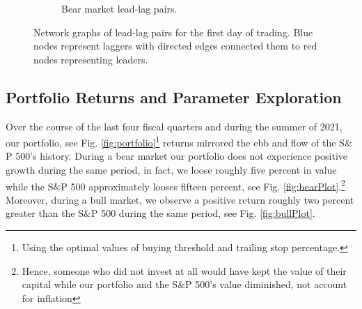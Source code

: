 \documentclass{article}
\begin{document}
\begin{figure}[H]
\begin{subfigure}{0.45\textwidth}
        \caption{Bear market lead-lag pairs.}
        \label{fig:bearNetwork}
    \end{subfigure}
    \caption{Network graphs of lead-lag pairs for the first day of trading. Blue nodes represent laggers with directed edges connected them to red nodes representing leaders.}
    \label{fig:networks}
\end{figure}
\subsection{Portfolio Returns and Parameter Exploration}
Over the course of the last four fiscal quarters and during the summer of 2021, our portfolio, see Fig. \ref{fig:portfolio}\footnote{Using the optimal values of buying threshold and trailing stop percentage.} returns mirrored the ebb and flow of the S$\&$P 500's history. During a bear market our portfolio does not experience positive growth during the same period, in fact, we loose roughly five percent in value while the S$\&$P 500 approximately looses fifteen percent, see Fig. \ref{fig:bearPlot}.\footnote{Hence, someone who did not invest at all would have kept the value of their capital while our portfolio and the S$\&$P 500's value diminished, not account for inflation} Moreover, during a bull market, we observe a positive return roughly two percent greater than the S$\&$P 500 during the same period, see Fig. \ref{fig:bullPlot}.
\end{document}
